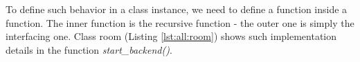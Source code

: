 To define such behavior in a class instance, we need to define a function
inside a function. The inner function is the recursive function - the outer one
is simply the interfacing one. Class room (Listing \ref{lst:all:room}) shows
such implementation details in the function \textit{start\_backend()}.

